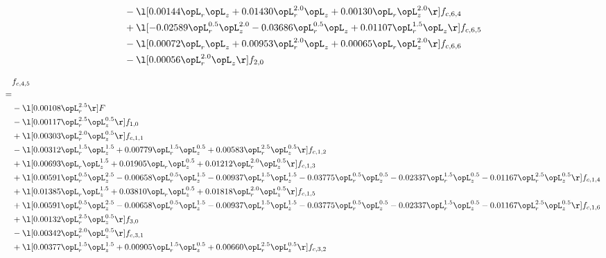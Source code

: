 \begin{alignat}{2}
& - \l[  0.00144 \opL_r \opL_z +  0.01430 \opL_r^{2.0} \opL_z +  0.00130 \opL_r \opL_z^{2.0}  \r] f_{c,6,4} \nonumber \\ 
& + \l[  -0.02589 \opL_r^{0.5} \opL_z^{2.0}   -0.03686 \opL_r^{0.5} \opL_z +  0.01107 \opL_r^{1.5} \opL_z  \r] f_{c,6,5} \nonumber \\ 
& - \l[  0.00072 \opL_r \opL_z +  0.00953 \opL_r^{2.0} \opL_z +  0.00065 \opL_r \opL_z^{2.0}  \r] f_{c,6,6} \nonumber \\ 
& - \l[  0.00056 \opL_r^{2.0} \opL_z  \r] f_{2,0} \nonumber \\ 
\end{alignat} 


\begin{alignat}{2} 
\label{eq:f_45_1} 
& f_{c,4,5} \nonumber \\ 
 = \\ 
& - \l[  0.00108 \opL_r^{2.5}  \r] F \nonumber \\ 
& - \l[  0.00117 \opL_r^{2.5} \opL_z^{0.5}  \r] f_{1,0} \nonumber \\ 
& + \l[  0.00303 \opL_r^{2.0} \opL_z^{0.5}  \r] f_{c,1,1} \nonumber \\ 
& - \l[  0.00312 \opL_r^{1.5} \opL_z^{1.5} +  0.00779 \opL_r^{1.5} \opL_z^{0.5} +  0.00583 \opL_r^{2.5} \opL_z^{0.5}  \r] f_{c,1,2} \nonumber \\ 
& + \l[  0.00693 \opL_r \opL_z^{1.5} +  0.01905 \opL_r \opL_z^{0.5} +  0.01212 \opL_r^{2.0} \opL_z^{0.5}  \r] f_{c,1,3} \nonumber \\ 
& + \l[  0.00591 \opL_r^{0.5} \opL_z^{2.5}   -0.00658 \opL_r^{0.5} \opL_z^{1.5}   -0.00937 \opL_r^{1.5} \opL_z^{1.5}   -0.03775 \opL_r^{0.5} \opL_z^{0.5}   -0.02337 \opL_r^{1.5} \opL_z^{0.5}   -0.01167 \opL_r^{2.5} \opL_z^{0.5}  \r] f_{c,1,4} \nonumber \\ 
& + \l[  0.01385 \opL_r \opL_z^{1.5} +  0.03810 \opL_r \opL_z^{0.5} +  0.01818 \opL_r^{2.0} \opL_z^{0.5}  \r] f_{c,1,5} \nonumber \\ 
& + \l[  0.00591 \opL_r^{0.5} \opL_z^{2.5}   -0.00658 \opL_r^{0.5} \opL_z^{1.5}   -0.00937 \opL_r^{1.5} \opL_z^{1.5}   -0.03775 \opL_r^{0.5} \opL_z^{0.5}   -0.02337 \opL_r^{1.5} \opL_z^{0.5}   -0.01167 \opL_r^{2.5} \opL_z^{0.5}  \r] f_{c,1,6} \nonumber \\ 
& + \l[  0.00132 \opL_r^{2.5} \opL_z^{0.5}  \r] f_{3,0} \nonumber \\ 
& - \l[  0.00342 \opL_r^{2.0} \opL_z^{0.5}  \r] f_{c,3,1} \nonumber \\ 
& + \l[  0.00377 \opL_r^{1.5} \opL_z^{1.5} +  0.00905 \opL_r^{1.5} \opL_z^{0.5} +  0.00660 \opL_r^{2.5} \opL_z^{0.5}  \r] f_{c,3,2} \nonumber \\ 

\end{alignat}
